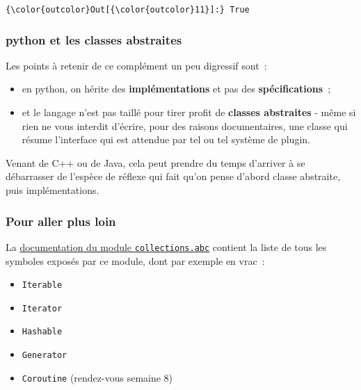 \begin{Verbatim}[commandchars=\\\{\},frame=single,framerule=0.3mm,rulecolor=\color{cellframecolor}]
{\color{outcolor}Out[{\color{outcolor}11}]:} True
\end{Verbatim}
            
    \hypertarget{python-et-les-classes-abstraites}{%
\subsubsection{python et les classes
abstraites}\label{python-et-les-classes-abstraites}}

    Les points à retenir de ce complément un peu digressif sont~:

\begin{itemize}
\tightlist
\item
  en python, on hérite des \textbf{implémentations} et pas des
  \textbf{spécifications}~;
\item
  et le langage n'est pas taillé pour tirer profit de \textbf{classes
  abstraites} - même si rien ne vous interdit d'écrire, pour des raisons
  documentaires, une classe qui résume l'interface qui est attendue par
  tel ou tel système de plugin.
\end{itemize}

    Venant de C++ ou de Java, cela peut prendre du temps d'arriver à se
débarrasser de l'espèce de réflexe qui fait qu'on pense d'abord classe
abstraite, puis implémentations.

    \hypertarget{pour-aller-plus-loin}{%
\subsubsection{Pour aller plus loin}\label{pour-aller-plus-loin}}

    La
\href{https://docs.python.org/3/library/collections.abc.html}{documentation
du module \texttt{collections.abc}} contient la liste de tous les
symboles exposés par ce module, dont par exemple en vrac~:

\begin{itemize}
\tightlist
\item
  \texttt{Iterable}
\item
  \texttt{Iterator}
\item
  \texttt{Hashable}
\item
  \texttt{Generator}
\item
  \texttt{Coroutine} (rendez-vous semaine 8)
\end{itemize}

